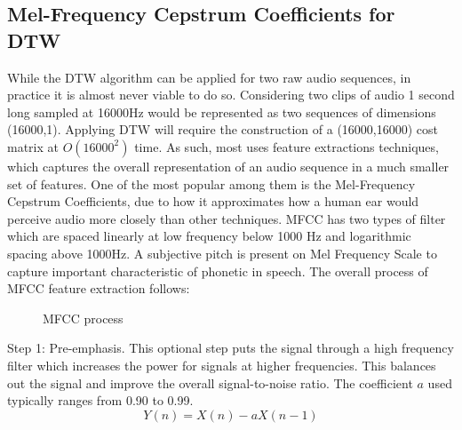     \subsection{Mel-Frequency Cepstrum Coefficients for DTW}
    While the DTW algorithm can be applied for two raw audio sequences, in practice it is almost never viable to do so. Considering two clips of audio 1 second long sampled at 16000Hz would be represented as two sequences of dimensions (16000,1). Applying DTW will require the construction of a (16000,16000) cost matrix at $O(16000^2)$ time. As such, most uses feature extractions techniques, which captures the overall representation of an audio sequence in a much smaller set of features. One of the most popular among them is the Mel-Frequency Cepstrum Coefficients, due to how it approximates how a human ear would perceive audio more closely than other techniques. MFCC has two
    types of filter which are spaced linearly at low frequency
    below 1000 Hz and logarithmic spacing above 1000Hz. A
    subjective pitch is present on Mel Frequency Scale to capture important characteristic of phonetic in speech.\cite{muda}  
    The overall process of MFCC feature extraction follows:
    \newpage
    \begin{figure}
        \centering
        \caption{MFCC process}
        \label{fig:mfcc_flow}
    \end{figure}
    Step 1: Pre-emphasis.
    This optional step puts the signal through a high frequency filter which increases the power for signals at higher frequencies. This balances out the signal and improve the overall signal-to-noise ratio. The coefficient $a$ used typically ranges from 0.90 to 0.99.
    \begin{equation}
        Y(n) = X(n) -aX(n-1)
    \end{equation}
    

